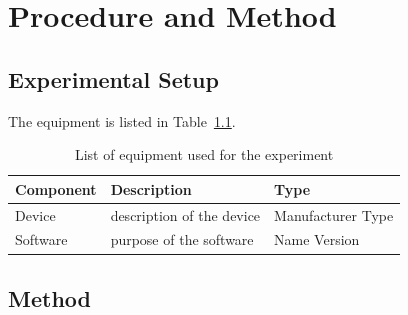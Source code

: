 \chapter{Procedure and Method}\label{ch:procedure}

\section{Experimental Setup}\label{sec:setup}
The equipment is listed in Table~\ref{tab:equipment}.

\begin{table}[H]
  \centering
  \caption[List of equipment]{List of equipment used for the experiment}
  \label{tab:equipment}
  \begin{tabularx}{\textwidth}{l >{\raggedright\arraybackslash}X l}
    \toprule
    Component & Description & Type \\
    \midrule
    Device      & description of the device & Manufacturer Type \\
    Software    & purpose of the software   & Name Version \\
    \bottomrule
  \end{tabularx}
\end{table}

\section{Method}\label{sec:method}
